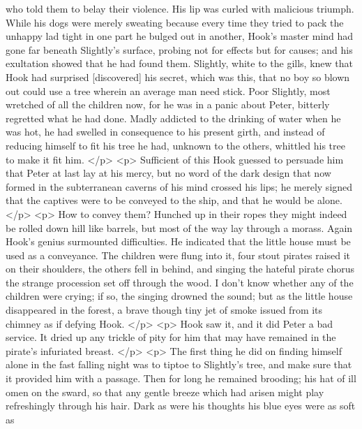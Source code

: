       who told them to belay their violence. His lip was curled with malicious
      triumph. While his dogs were merely sweating because every time they tried
      to pack the unhappy lad tight in one part he bulged out in another, Hook's
      master mind had gone far beneath Slightly's surface, probing not for
      effects but for causes; and his exultation showed that he had found them.
      Slightly, white to the gills, knew that Hook had surprised [discovered]
      his secret, which was this, that no boy so blown out could use a tree
      wherein an average man need stick. Poor Slightly, most wretched of all the
      children now, for he was in a panic about Peter, bitterly regretted what
      he had done. Madly addicted to the drinking of water when he was hot, he
      had swelled in consequence to his present girth, and instead of reducing
      himself to fit his tree he had, unknown to the others, whittled his tree
      to make it fit him.
    </p>
    <p>
      Sufficient of this Hook guessed to persuade him that Peter at last lay at
      his mercy, but no word of the dark design that now formed in the
      subterranean caverns of his mind crossed his lips; he merely signed that
      the captives were to be conveyed to the ship, and that he would be alone.
    </p>
    <p>
      How to convey them? Hunched up in their ropes they might indeed be rolled
      down hill like barrels, but most of the way lay through a morass. Again
      Hook's genius surmounted difficulties. He indicated that the little house
      must be used as a conveyance. The children were flung into it, four stout
      pirates raised it on their shoulders, the others fell in behind, and
      singing the hateful pirate chorus the strange procession set off through
      the wood. I don't know whether any of the children were crying; if so, the
      singing drowned the sound; but as the little house disappeared in the
      forest, a brave though tiny jet of smoke issued from its chimney as if
      defying Hook.
    </p>
    <p>
      Hook saw it, and it did Peter a bad service. It dried up any trickle of
      pity for him that may have remained in the pirate's infuriated breast.
    </p>
    <p>
      The first thing he did on finding himself alone in the fast falling night
      was to tiptoe to Slightly's tree, and make sure that it provided him with
      a passage. Then for long he remained brooding; his hat of ill omen on the
      sward, so that any gentle breeze which had arisen might play refreshingly
      through his hair. Dark as were his thoughts his blue eyes were as soft as
